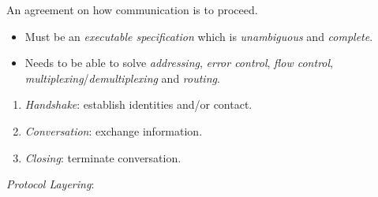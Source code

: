 \documentclass[twocolumn,english]{article}
\begin{document}
An agreement on how communication is to proceed.
\begin{itemize}
\item Must be an \emph{executable specification} which is \emph{unambiguous}
and \emph{complete}.
\item Needs to be able to solve \emph{addressing}, \emph{error control},
\emph{flow control}, \emph{multiplexing}/\emph{demultiplexing} and
\emph{routing}.
\end{itemize}
\begin{enumerate}
\item \emph{Handshake}: establish identities and/or contact.
\item \emph{Conversation}: exchange information.
\item \emph{Closing}: terminate conversation.
\end{enumerate}
\emph{Protocol Layering}:
\end{document}
